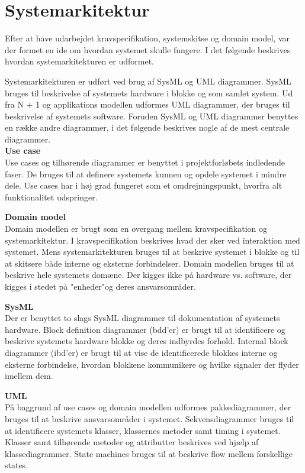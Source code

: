 \section{Systemarkitektur}
\label{chap:systemarkitektur}

Efter at have udarbejdet kravspecifikation, systemskitse og domain model, var der formet en ide om hvordan systemet skulle fungere. I det følgende beskrives hvordan systemarkitekturen er udformet. 

Systemarkitekturen er udført ved brug af SysML og UML diagrammer. 
SysML bruges til beskrivelse af systemets hardware i blokke og som samlet system. Ud fra N + 1 og applikations modellen udformes UML diagrammer, der bruges til beskrivelse af systemets software. 
Foruden SysML og UML diagrammer benyttes en række andre diagrammer, i det følgende beskrives nogle af de mest centrale diagrammer.\\


\textbf{Use case}\\
Use cases og tilhørende diagrammer er benyttet i projektforløbets indledende faser. De bruges til at definere systemets kunnen og opdele systemet i mindre dele. Use cases har i høj grad fungeret som et omdrejningspunkt, hvorfra alt funktionalitet udspringer.

\textbf{Domain model}\\
Domain modellen er brugt som en overgang mellem kravspecifikation og systemarkitektur.
I kravspecifikation beskrives hvad der sker ved interaktion med systemet. Mens
systemarkitekturen bruges til at beskrive systemet i blokke og til at skitsere både interne
og eksterne forbindelser. Domain modellen bruges til at beskrive hele systemets domæne.
Der kigges ikke på hardware vs. software, der kigges i stedet på "enheder"og deres
ansvarsområder.

\textbf{SysML}\\
Der er benyttet to slags SysML diagrammer til dokumentation af systemets hardware. Block definition diagrammer (bdd'er) er brugt til at identificere og beskrive systemets hardware blokke og deres indbyrdes forhold. Internal block diagrammer (ibd'er) er brugt til at vise de identificerede blokkes interne og eksterne forbindelse, hvordan blokkene kommunikere og hvilke signaler der flyder imellem dem.


\textbf{UML}\\
På baggrund af use cases og domain modellen udformes pakkediagrammer, der bruges til at beskrive ansvarsområder i systemet. Sekvensdiagrammer bruges til at identificere systemets klasser, klassernes metoder samt timing i systemet. Klasser samt tilhørende metoder og attributter beskrives ved hjælp af klassediagrammer. State machines bruges til at beskrive flow mellem forskellige states. 


